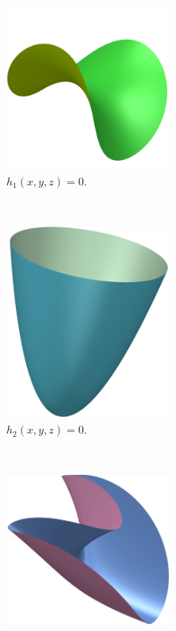 \documentclass{article}
\begin{document}
\begin{example}
    \begin{figure}[]
        \centering
        \begin{subfigure}[t]{0.3\textwidth}
            \includegraphics[height=0.6\textwidth, width=0.6\textwidth]{../pictures/example_one.png}
            \caption{$h_1(x, y, z) = 0$.}
        \end{subfigure}
        ~
        \begin{subfigure}[t]{0.3\textwidth}
            \includegraphics[height=0.6\textwidth, width=0.6\textwidth]{../pictures/example_two.png}
            \caption{$h_2(x, y, z) = 0$.}
        \end{subfigure}
        ~
        \begin{subfigure}[t]{0.3\textwidth}
            \includegraphics[height=0.6\textwidth, width=0.6\textwidth]{../pictures/example_three.png}

\end{subfigure}
\end{figure}
\end{example}
\end{document}
